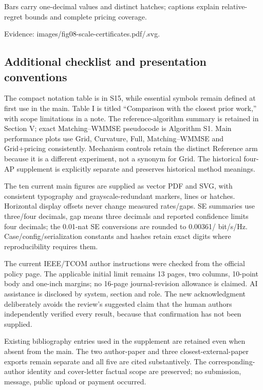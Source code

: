 \documentclass[10pt]{article}
\begin{document}
Bars carry one-decimal values and distinct hatches; captions explain relative-regret bounds and complete pricing coverage.

{\small Evidence: images/\allowbreak fig08-scale-certificates.pdf/\allowbreak .svg.}

\subsection*{Additional checklist and presentation conventions}

The compact notation table is in S15, while essential symbols remain defined at first use in the main. Table I is titled ``Comparison with the closest prior work,'' with scope limitations in a note. The reference-algorithm summary is retained in Section V; exact Matching--WMMSE pseudocode is Algorithm S1. Main performance plots use Grid, Curvature, Full, Matching--WMMSE and Grid+pricing consistently. Mechanism controls retain the distinct Reference arm because it is a different experiment, not a synonym for Grid. The historical four-AP supplement is explicitly separate and preserves historical method meanings.

The ten current main figures are supplied as vector PDF and SVG, with consistent typography and grayscale-redundant markers, lines or hatches. Horizontal display offsets never change measured rates/\allowbreak gaps. SE summaries use three/\allowbreak four decimals, gap means three decimals and reported confidence limits four decimals; the 0.01-nat SE conversions are rounded to 0.00361/ bit/\allowbreak s/\allowbreak Hz. Case/\allowbreak config/\allowbreak serialization constants and hashes retain exact digits where reproducibility requires them.

The current IEEE/\allowbreak TCOM author instructions were checked from the official policy page. The applicable initial limit remains 13 pages, two columns, 10-point body and one-inch margins; no 16-page journal-revision allowance is claimed. AI assistance is disclosed by system, section and role. The new acknowledgment deliberately avoids the review's suggested claim that the human authors independently verified every result, because that confirmation has not been supplied.

Existing bibliography entries used in the supplement are retained even when absent from the main. The two author-paper and three closest-external-paper exports remain separate and all five are cited substantively. The corresponding-author identity and cover-letter factual scope are preserved; no submission, message, public upload or payment occurred.
\end{document}
